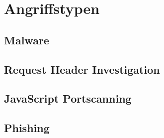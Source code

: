 \section{Angriffstypen}

\subsection{Malware}

\subsection{Request Header Investigation}

\subsection{JavaScript Portscanning}

\subsection{Phishing}
